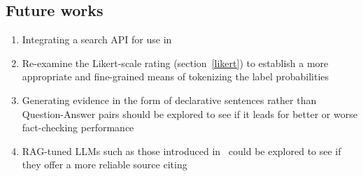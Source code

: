 \subsection{Future works}
\begin{enumerate}
    \item Integrating a search API for use in  
    \item Re-examine the Likert-scale rating (section~\ref{likert}) to establish a more appropriate and fine-grained means of tokenizing the label probabilities
    \item Generating evidence in the form of declarative sentences rather than Question-Answer pairs should be explored to see if it leads for better or worse fact-checking performance
    \item RAG-tuned LLMs such as those introduced in~\cite{menick2022teachinglanguagemodelssupport} could be explored to see if they offer a more reliable source citing
\end{enumerate}